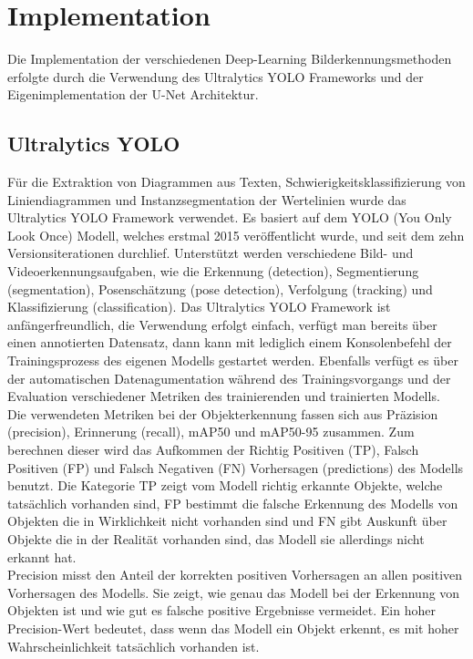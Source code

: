 \chapter{Implementation}
\label{ch:implementation}

Die Implementation der verschiedenen Deep-Learning Bilderkennungsmethoden erfolgte durch die Verwendung des Ultralytics YOLO \cite{Jocher_Ultralytics_YOLO_2023} Frameworks und der Eigenimplementation der U-Net \cite{ronneberger2015unetconvolutionalnetworksbiomedical} Architektur.

\section{Ultralytics YOLO}
Für die Extraktion von Diagrammen aus Texten, Schwierigkeitsklassifizierung von Liniendiagrammen und Instanzsegmentation der Wertelinien wurde das Ultralytics YOLO Framework verwendet. Es basiert auf dem YOLO (You Only Look Once) Modell, welches erstmal 2015 \cite{redmon2016lookonceunifiedrealtime} veröffentlicht wurde, und seit dem zehn Versionsiterationen durchlief. Unterstützt werden verschiedene Bild- und Videoerkennungsaufgaben, wie die Erkennung (detection), Segmentierung (segmentation), Posenschätzung (pose detection), Verfolgung (tracking) und Klassifizierung (classification). Das Ultralytics YOLO Framework ist anfängerfreundlich, die Verwendung erfolgt einfach, verfügt man bereits über einen annotierten Datensatz, dann kann mit lediglich einem Konsolenbefehl der Trainingsprozess des eigenen Modells gestartet werden. Ebenfalls verfügt es über der automatischen Datenagumentation während des Trainingsvorgangs und der Evaluation verschiedener Metriken des trainierenden und trainierten Modells.
\\
Die verwendeten Metriken bei der Objekterkennung fassen sich aus Präzision (precision), Erinnerung (recall), mAP50 und mAP50-95 zusammen. Zum berechnen dieser wird das Aufkommen der Richtig Positiven (TP), Falsch Positiven (FP) und Falsch Negativen (FN) Vorhersagen (predictions) des Modells benutzt. Die Kategorie TP zeigt vom Modell richtig erkannte Objekte, welche tatsächlich vorhanden sind, FP bestimmt die falsche Erkennung des Modells von Objekten die in Wirklichkeit nicht vorhanden sind und FN gibt Auskunft über Objekte die in der Realität vorhanden sind, das Modell sie allerdings nicht erkannt hat.
\\
Precision misst den Anteil der korrekten positiven Vorhersagen an allen positiven Vorhersagen des Modells. Sie zeigt, wie genau das Modell bei der Erkennung von Objekten ist und wie gut es falsche positive Ergebnisse vermeidet. Ein hoher Precision-Wert bedeutet, dass wenn das Modell ein Objekt erkennt, es mit hoher Wahrscheinlichkeit tatsächlich vorhanden ist.

